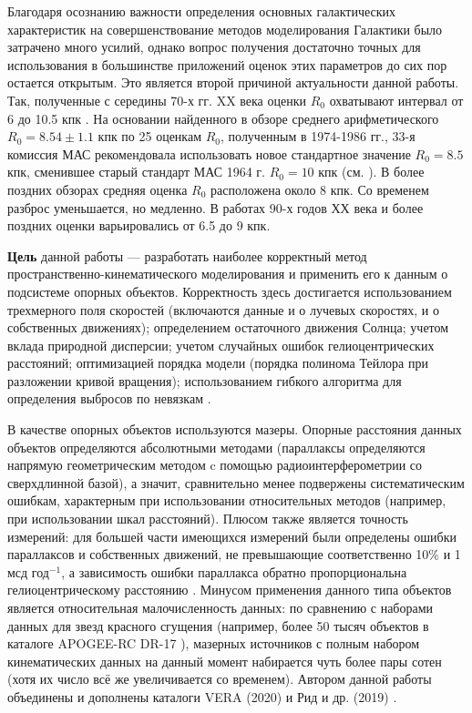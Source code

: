\documentclass[a4paper, oneside, 14pt]{article}
\begin{document}
Благодаря осознанию важности определения основных галактических характеристик на совершенствование методов моделирования Галактики было затрачено много усилий, однако вопрос получения достаточно точных для использования в большинстве приложений оценок этих параметров до сих пор остается открытым. Это является второй причиной актуальности данной работы. Так, полученные с середины 70-х гг. XX века оценки $ R_0 $ охватывают интервал от 6 до 10.5 кпк \cite{K.L.1986, F.1987, R.1993}. На основании найденного в обзоре \cite{K.L.1986} среднего арифметического $ R_0 = 8.54 \pm 1.1 $ кпк по 25 оценкам $ R_0 $, полученным в 1974-1986 гг., 33-я комиссия МАС рекомендовала использовать новое стандартное значение $ R_0 = 8.5 $ кпк, сменившее старый стандарт МАС 1964 г. $ R_0 = 10 $ кпк (см. \cite{F.T.1991}). В более поздних обзорах \cite{R.1993, N.2004} средняя оценка $ R_0 $ расположена около 8 кпк. Со временем разброс уменьшается, но медленно. В работах 90-х годов ХХ века и более поздних оценки варьировались от 6.5 до 9 кпк.

\textbf{Цель} данной работы --- разработать наиболее корректный метод пространственно-кинематического моделирования и применить его к данным о подсистеме опорных объектов. Корректность здесь достигается использованием трехмерного поля скоростей (включаются данные и о лучевых скоростях, и о собственных движениях); определением остаточного движения Солнца; учетом вклада природной дисперсии; учетом случайных ошибок гелиоцентрических расстояний; оптимизацией порядка модели (порядка полинома Тейлора при разложении кривой вращения); использованием гибкого алгоритма для определения выбросов по невязкам \cite{N.2012}.

В качестве опорных объектов используются мазеры. Опорные расстояния данных объектов определяются абсолютными методами (параллаксы определяются напрямую геометрическим методом c помощью радиоинтерферометрии со сверхдлинной базой), а значит, сравнительно менее подвержены систематическим ошибкам, характерным при использовании относительных методов (например, при использовании шкал расстояний). Плюсом также является точность измерений: для большей части имеющихся измерений были определены ошибки параллаксов и собственных движений, не превышающие соответственно 10\% и 1 мсд год$^{-1}$, а зависимость ошибки параллакса обратно пропорциональна гелиоцентрическому расстоянию \cite{N.V.2018}. Минусом применения данного типа объектов является относительная малочисленность данных: по сравнению с наборами данных для звезд красного сгущения (например, более 50 тысяч объектов в каталоге APOGEE-RC DR-17 \cite{DR17-APOGEE}), мазерных источников с полным набором кинематических данных на данный момент набирается чуть более пары сотен (хотя их число всё же увеличивается со временем). Автором данной работы объединены и дополнены каталоги VERA (2020) \cite{VERA.2020} и Рид и др. (2019) \cite{Reid.2019}.
\end{document}
